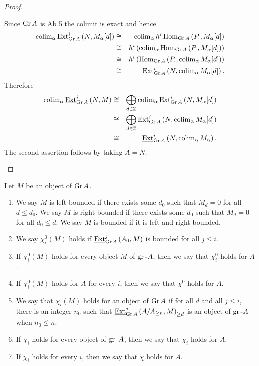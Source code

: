 \documentclass[dissertation.tex]{subfiles}
\begin{document}
\begin{prop}
\begin{proof}
\begin{enumerate}
      Since $\operatorname{Gr}A$ is Ab 5 the colimit is exact and hence
      \begin{eqnarray*}
        \operatorname{colim}_\alpha \operatorname{Ext}^{i}_{\operatorname{Gr}A}\left(N, M_\alpha[d]\right)
        &\cong& \operatorname{colim}_\alpha h^i\operatorname{Hom}_{\operatorname{Gr}A}\left(P_\cdot, M_\alpha[d]\right)\\
        &\cong& h^i\left(\operatorname{colim}_\alpha \operatorname{Hom}_{\operatorname{Gr}A}\left(P_\cdot, M_\alpha[d]\right) \right)\\
        &\cong& h^i\left(\operatorname{Hom}_{\operatorname{Gr}A}\left(P_\cdot, \operatorname{colim}_\alpha M_\alpha[d]\right)\right)\\
        &\cong& \operatorname{Ext}^{i}_{\operatorname{Gr}A}\left(N, \operatorname{colim}_\alpha M_\alpha[d]\right).
      \end{eqnarray*}
      Therefore 
      \begin{eqnarray*}
        \operatorname{colim}_\alpha \operatorname{\underline{Ext}}^{i}_{\operatorname{Gr}A}\left(N,M\right) 
        &\cong& \bigoplus_{d \in \mathbb{Z}}\operatorname{colim}_\alpha \operatorname{Ext}^{i}_{\operatorname{Gr}A}\left(N, M_\alpha[d]\right)\\
        &\cong& \bigoplus_{d \in \mathbb{Z}}\operatorname{Ext}^{i}_{\operatorname{Gr}A}\left(N, \operatorname{colim}_\alpha M_\alpha[d]\right)\\
        &\cong& \operatorname{\underline{Ext}}^{i}_{\operatorname{Gr}A}\left(N, \operatorname{colim}_\alpha M_\alpha\right).
      \end{eqnarray*}
      The second assertion follows by taking $A = N$.
    \end{enumerate}
  \end{proof}

  \begin{defn}
    Let $M$ be an object of $\operatorname{Gr}A$.
    \begin{enumerate}
    \item
      We say $M$ is left bounded if there exists some $d_0$ such that $M_d = 0$ for all $d \leq d_0$.
      We say $M$ is right bounded if there exists some $d_0$ such that $M_d = 0$ for all $d_0 \leq d$.
      We say $M$ is bounded if it is left and right bounded.
    \item
      We say $\chi_i^0(M)$ holds if $\operatorname{\underline{Ext}}^{j}_{\operatorname{Gr}A}\left(A_0, M\right)$ is bounded for all $j \leq i$.
    \item
      If $\chi^0_i(M)$ holds for every object $M$ of $\operatorname{gr}\text{-}A$, then we say that $\chi^0_i$ holds for $A$.
    \item
      If $\chi^0_i(M)$ holds for $A$ for every $i$, then we say that $\chi^0$ holds for $A$.
    \item
      We say that $\chi_i(M)$ holds for an object of $\operatorname{Gr}A$ if for all $d$ and all $j \leq i$, there is an integer $n_0$ such that $\operatorname{\underline{Ext}}^{j}_{\operatorname{Gr}A}\left(A/A_{\geq n}, M\right)_{\geq d}$ is an object of $\operatorname{gr}\text{-}A$ when $n_0 \leq n$.
    \item
      If $\chi_i$ holds for every object of $\operatorname{gr}\text{-}A$, then we say that $\chi_i$ holds for $A$.
    \item
      If $\chi_i$ holds for every $i$, then we say that $\chi$ holds for $A$.
    \end{enumerate}
  \end{defn}


\end{prop}
\end{document}
